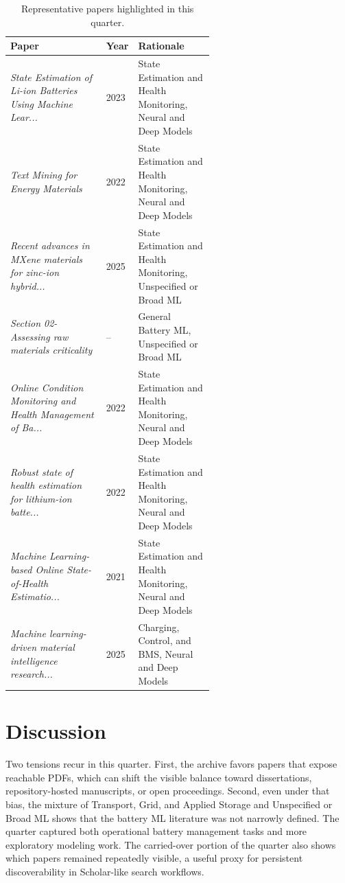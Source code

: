 \documentclass[conference]{IEEEtran}
\begin{document}
\begin{table}[t]
\caption{Representative papers highlighted in this quarter.}
\label{tab:notable}
\centering
\footnotesize
\begin{tabularx}{\linewidth}{p{0.47\linewidth} p{0.12\linewidth} X}
\toprule
Paper & Year & Rationale \\
\midrule
\textit{State Estimation of Li-ion Batteries Using Machine Lear...} \cite{stateestimationof2023} & 2023 & State Estimation and Health Monitoring, Neural and Deep Models \\
\textit{Text Mining for Energy Materials} \cite{textminingfor2022} & 2022 & State Estimation and Health Monitoring, Neural and Deep Models \\
\textit{Recent advances in MXene materials for zinc-ion hybrid...} \cite{recentadvancesin2025} & 2025 & State Estimation and Health Monitoring, Unspecified or Broad ML \\
\textit{Section 02-Assessing raw materials criticality} \cite{section02assessingna} & -- & General Battery ML, Unspecified or Broad ML \\
\textit{Online Condition Monitoring and Health Management of Ba...} \cite{onlineconditionmonitorin2022} & 2022 & State Estimation and Health Monitoring, Neural and Deep Models \\
\textit{Robust state of health estimation for lithium-ion batte...} \cite{robuststateof2022} & 2022 & State Estimation and Health Monitoring, Neural and Deep Models \\
\textit{Machine Learning-based Online State-of-Health Estimatio...} \cite{machinelearningbased2021} & 2021 & State Estimation and Health Monitoring, Neural and Deep Models \\
\textit{Machine learning-driven material intelligence research...} \cite{machinelearningdriven2025} & 2025 & Charging, Control, and BMS, Neural and Deep Models \\
\bottomrule
\end{tabularx}
\end{table}

\section{Discussion}
Two tensions recur in this quarter. First, the archive favors papers that expose reachable PDFs, which can shift the visible balance toward dissertations, repository-hosted manuscripts, or open proceedings. Second, even under that bias, the mixture of Transport, Grid, and Applied Storage and Unspecified or Broad ML shows that the battery ML literature was not narrowly defined. The quarter captured both operational battery management tasks and more exploratory modeling work. The carried-over portion of the quarter also shows which papers remained repeatedly visible, a useful proxy for persistent discoverability in Scholar-like search workflows.
\end{document}
